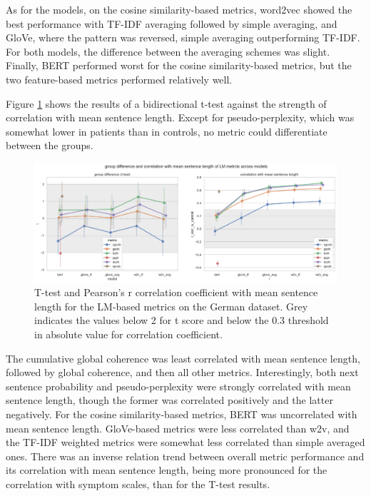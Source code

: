 As for the models, on the cosine similarity-based metrics, word2vec showed the best performance with TF-IDF averaging followed by simple averaging, and GloVe, where the pattern was reversed, simple averaging outperforming TF-IDF. For both models, the difference between the averaging schemes was slight. Finally, BERT performed worst for the cosine similarity-based metrics, but the two feature-based metrics performed relatively well.


Figure \ref{fig:results:lm:de:ttest} shows the results of a bidirectional t-test against the strength of correlation with mean sentence length. Except for pseudo-perplexity, which was somewhat lower in patients than in controls, no metric could differentiate between the groups.

\begin{figure}[ht!]
    \includegraphics[width=1.1\textwidth, center]{Figures/chapter_4/LM/de_t_test_corr_len.png} 
\captionsetup{width=\textwidth}
\caption[LM Metrics: German (T-Test)]{\label{fig:results:lm:de:ttest} T-test and Pearson's r correlation coefficient with mean sentence length for the LM-based metrics on the German dataset. Grey indicates the values below 2 for t score and below the 0.3 threshold in absolute value for correlation coefficient.}
\end{figure}

The cumulative global coherence was least correlated with mean sentence length, followed by global coherence, and then all other metrics. Interestingly, both next sentence probability and pseudo-perplexity were strongly correlated with mean sentence length, though the former was correlated positively and the latter negatively. For the cosine similarity-based metrics, BERT was uncorrelated with mean sentence length. GloVe-based metrics were less correlated than w2v, and the TF-IDF weighted metrics were somewhat less correlated than simple averaged ones. There was an inverse relation trend between overall metric performance and its correlation with mean sentence length, being more pronounced for the correlation with symptom scales, than for the T-test results.

